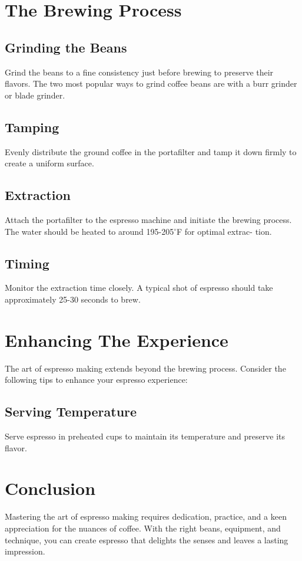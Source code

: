 \documentclass[12pt, a4paper]{article}
\begin{document}
\section{The Brewing Process}
\begin{multicols}{2}
    \subsection{Grinding the Beans}
    Grind the beans to a fine consistency just before brewing to preserve their flavors. The two most popular ways to grind coffee beans are with a burr grinder or blade grinder.
    \subsection{Tamping}
    Evenly distribute the ground coffee in the portafilter and tamp it down firmly to create a uniform surface.
    \subsection{Extraction}
    Attach the portafilter to the espresso machine and initiate the brewing process. The water should be heated to around 195-205$^{\circ}$F for optimal extrac-
tion.
\subsection{Timing}
Monitor the extraction time closely. A typical
shot of espresso should take approximately 25-30
seconds to brew.
\end{multicols}
\section{Enhancing The Experience}
The art of espresso making extends beyond the brewing process. Consider the following tips to enhance your espresso experience:
\subsection{Serving Temperature}
Serve espresso in preheated cups to maintain its temperature and preserve its flavor.
\section{Conclusion}
Mastering the art of espresso making requires dedication, practice, and a keen appreciation for the nuances of coffee. With the right beans, equipment, and technique, you can create espresso that delights the senses and leaves a lasting impression.
\end{document}
